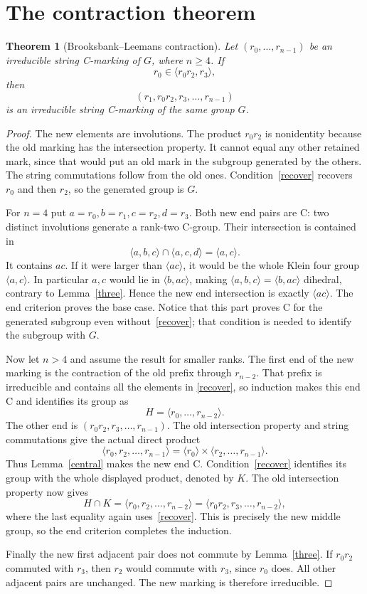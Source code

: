 \documentclass[a4paper,11pt]{article}
\newcommand{\gen}[1]{\langle#1\rangle}
\newtheorem{theorem}{Theorem}\newtheorem{lemma}[theorem]{Lemma}\newtheorem{corollary}[theorem]{Corollary}
\begin{document}
\section{The contraction theorem}
\begin{theorem}[Brooksbank--Leemans contraction]\label{contraction}
Let $(r_0,\ldots,r_{n-1})$ be an irreducible string C-marking of $G$,
where $n\geq4$. If
\begin{equation}\label{recover}
 r_0\in\gen{r_0r_2,r_3},
\end{equation}
then
\[
 (r_1,r_0r_2,r_3,\ldots,r_{n-1})
\]
is an irreducible string C-marking of the same group $G$.
\end{theorem}
\begin{proof}
The new elements are involutions. The product $r_0r_2$ is nonidentity
because the old marking has the intersection property. It cannot equal
any other retained mark, since that would put an old mark in the subgroup
generated by the others. The string commutations follow from the old ones.
Condition~\eqref{recover} recovers $r_0$ and then $r_2$, so the generated
group is $G$.

For $n=4$ put $a=r_0,b=r_1,c=r_2,d=r_3$. Both new end pairs are C:
two distinct involutions generate a rank-two C-group. Their intersection
is contained in
\[
 \gen{a,b,c}\cap\gen{a,c,d}=\gen{a,c}.
\]
It contains $ac$. If it were larger than $\gen{ac}$, it would be the
whole Klein four group $\gen{a,c}$. In particular $a,c$ would lie in
$\gen{b,ac}$, making $\gen{a,b,c}=\gen{b,ac}$ dihedral, contrary to
Lemma~\ref{three}. Hence the new end intersection is exactly $\gen{ac}$.
The end criterion proves the base case. Notice that this part proves C for
the generated subgroup even without~\eqref{recover}; that condition is
needed to identify the subgroup with $G$.

Now let $n>4$ and assume the result for smaller ranks. The first end of the
new marking is the contraction of the old prefix through $r_{n-2}$.
That prefix is irreducible and contains all the elements in
\eqref{recover}, so induction makes this end C and identifies its group as
\[
 H=\gen{r_0,\ldots,r_{n-2}}.
\]
The other end is $(r_0r_2,r_3,\ldots,r_{n-1})$. The old intersection
property and string commutations give the actual direct product
\[
 \gen{r_0,r_2,\ldots,r_{n-1}}
 =\gen{r_0}\times\gen{r_2,\ldots,r_{n-1}}.
\]
Thus Lemma~\ref{central} makes the new end C. Condition~\eqref{recover}
identifies its group with the whole displayed product, denoted by $K$.
The old intersection property now gives
\[
 H\cap K=\gen{r_0,r_2,\ldots,r_{n-2}}
        =\gen{r_0r_2,r_3,\ldots,r_{n-2}},
\]
where the last equality again uses~\eqref{recover}. This is precisely the
new middle group, so the end criterion completes the induction.

Finally the new first adjacent pair does not commute by
Lemma~\ref{three}. If $r_0r_2$ commuted with $r_3$, then $r_2$ would
commute with $r_3$, since $r_0$ does. All other adjacent pairs are unchanged.
The new marking is therefore irreducible.
\end{proof}
\end{document}
